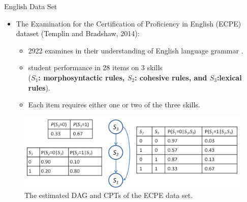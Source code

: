 \documentclass[hyperref={pdfpagelabels=false}]{beamer}
\begin{document}
\begin{frame}{English Data Set}
	\begin{itemize}\small 
		\item The Examination for the Certification of Proficiency in English (ECPE) dataset (Templin and Bradshaw, 2014):
		\begin{itemize}
		\item 2922 examines in their understanding of English language grammar .
		\item student performance in 28 items on 3 skills \\
		(\textbf{$S_1$: morphosyntactic rules, $S_2$: cohesive rules, and $S_3$:lexical rules}). 
		\item Each item requires either one or two of the three skills.	
		\end{itemize}	
\end{itemize}

				\begin{figure}[!th]
					\begin{center}
						\centering
						\includegraphics[width=0.9\linewidth]{figures/ecpe_results.png}
					\end{center}
					\caption{%
						\footnotesize The estimated DAG and CPTs of the ECPE data set.}
					\label{fig:ecpe-result} 
				\end{figure}
\end{frame}
\end{document}
